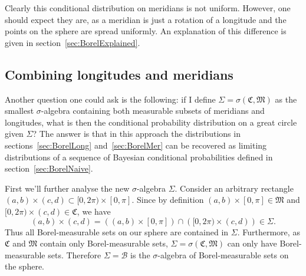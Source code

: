 \documentclass[twoside,a4paper]{report}
\theoremstyle{plain}
\theoremstyle{definition}
\theoremstyle{remark}
\numberwithin{equation}{chapter}
\DeclareMathOperator{\1}{\mathbbm{1}}
\newcommand{\B}{\mathcal{B}}
\begin{document}
Clearly this conditional distribution on meridians is not uniform. However, one should expect they are, as a meridian is just a rotation of a longitude and the points on the sphere are spread uniformly. An explanation of this difference is given in section~\ref{sec:BorelExplained}.

\subsection{Combining longitudes and meridians}
Another question one could ask is the following: if I define $\Sigma=\sigma(\mathfrak{C},\mathfrak{M})$ as the smallest $\sigma$-algebra containing both measurable subsets of meridians and longitudes, what is then the conditional probability distribution on a great circle given $\Sigma$? The answer is that in this approach the distributions in sections~\ref{sec:BorelLong} and~\ref{sec:BorelMer} can be recovered as limiting distributions of a sequence of Bayesian conditional probabilities defined in section~\ref{sec:BorelNaive}.

First we'll further analyse the new $\sigma$-algebra $\Sigma$. Consider an arbitrary rectangle $(a,b)\times(c,d)\subset[0,2\pi)\times[0,\pi]$. Since by definition $(a,b)\times[0,\pi]\in\mathfrak{M}$ and $[0,2\pi)\times(c,d)\in\mathfrak{C}$, we have
\[(a,b)\times(c,d)=\left((a,b)\times[0,\pi]\right)\cap\left([0,2\pi)\times(c,d)\right)\in\Sigma.\]
Thus all Borel-measurable sets on our sphere are contained in $\Sigma$. Furthermore, as $\mathfrak{C}$ and $\mathfrak{M}$ contain only Borel-measurable sets, $\Sigma=\sigma(\mathfrak{C},\mathfrak{M})$ can only have Borel-measurable sets. Therefore $\Sigma=\B$ is the $\sigma$-algebra of Borel-measurable sets on the sphere.
\end{document}
